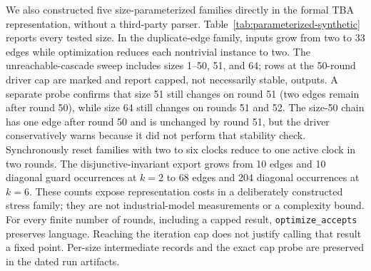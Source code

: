 We also constructed five size-parameterized families directly in the formal
TBA representation, without a third-party parser. Table~\ref{tab:parameterized-synthetic}
reports every tested size. In the duplicate-edge family, inputs grow from
two to 33 edges while optimization reduces each nontrivial instance to two.
The unreachable-cascade sweep includes sizes 1--50, 51, and 64; rows at the
50-round driver cap are marked and report capped, not necessarily stable,
outputs. A separate probe confirms that size 51 still changes on round 51
(two edges remain after round 50), while size 64 still changes on rounds 51
and 52. The size-50 chain has one edge after round 50 and is unchanged by
round 51, but the driver conservatively warns because it did not perform that
stability check. Synchronously reset families with two to six clocks reduce
to one active clock in two rounds.
The disjunctive-invariant export grows from 10 edges and 10 diagonal guard
occurrences at $k=2$ to 68 edges and 204 diagonal occurrences at $k=6$.
These counts expose representation costs in a deliberately constructed
stress family; they are not industrial-model measurements or a complexity
bound. For every finite number of rounds, including a capped result,
\texttt{optimize\_accepts} preserves language. Reaching the iteration cap
does not justify calling that result a fixed point. Per-size intermediate
records and the exact cap probe are preserved in the dated run artifacts.


